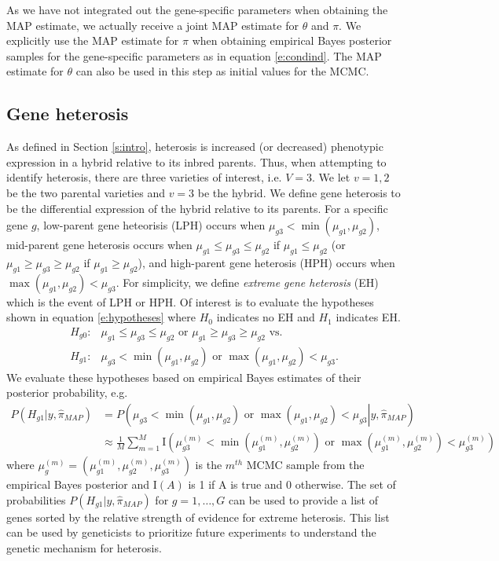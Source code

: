 \documentclass[useAMS,usenatbib,referee]{biom}
\begin{document}
As we have not integrated out the gene-specific parameters when obtaining the MAP estimate, we actually receive a joint MAP estimate for $\theta$ and $\pi$. We explicitly use the MAP estimate for $\pi$ when obtaining empirical Bayes posterior samples for the gene-specific parameters as in equation \eqref{e:condind}. The MAP estimate for $\theta$ can also be used in this step as initial values for the MCMC. 

\subsection{Gene heterosis}
\label{s:gene_heterosis}

As defined in Section \ref{s:intro}, heterosis is increased (or decreased) phenotypic expression in a hybrid relative to its inbred parents. Thus, when attempting to identify heterosis, there are three varieties of interest, i.e. $V=3$. We let $v=1,2$ be the two parental varieties and $v=3$ be the hybrid. We define gene heterosis to be the differential expression of the hybrid relative to its parents. For a specific gene $g$, low-parent gene heteorisis (LPH) occurs when $\mu_{g3}< \min(\mu_{g1},\mu_{g2})$, mid-parent gene heterosis occurs when $\mu_{g1}\le \mu_{g3}\le \mu_{g2}$ if $\mu_{g1}\le \mu_{g2}$ (or $\mu_{g1}\ge \mu_{g3}\ge \mu_{g2}$ if $\mu_{g1}\ge \mu_{g2}$), and high-parent gene heterosis (HPH) occurs when $\max(\mu_{g1},\mu_{g2}) < \mu_{g3}$. For simplicity, we define \emph{extreme gene heterosis} (EH) which is the event of LPH or HPH. Of interest is to evaluate the hypotheses shown in equation \eqref{e:hypotheses} where $H_0$ indicates no EH and $H_1$ indicates EH. 
\begin{align}
H_{g0}:&\mu_{g1}\le \mu_{g3}\le \mu_{g2} \mbox{ or } \mu_{g1}\ge \mu_{g3}\ge \mu_{g2} \mbox{\ \ vs.\ \ } \nonumber \\
H_{g1}:&\mu_{g3}< \min(\mu_{g1},\mu_{g2}) \mbox{ or } \max(\mu_{g1},\mu_{g2}) < \mu_{g3}.
\label{e:hypotheses}
\end{align}
We evaluate these hypotheses based on empirical Bayes estimates of their posterior probability, e.g. 
\begin{align}
P\left(H_{g1}|y, \hat{\pi}_{MAP}\right) &= P\left(\left.\mu_{g3}< \min(\mu_{g1},\mu_{g2}) \mbox{ or } \max(\mu_{g1},\mu_{g2}) < \mu_{g3}\right| y, \hat{\pi}_{MAP}\right) \nonumber \\
&\approx \frac{1}{M} \sum_{m=1}^M \mathrm{I}\left(\mu_{g3}^{(m)}< \min\left(\mu_{g1}^{(m)},\mu_{g2}^{(m)}\right) \mbox{ or } \max\left(\mu_{g1}^{(m)},\mu_{g2}^{(m)}\right) < \mu_{g3}^{(m)}\right) \label{e:probs}
\end{align}
where $\mu_g^{(m)} = \left(\mu_{g1}^{(m)},\mu_{g2}^{(m)},\mu_{g3}^{(m)}\right)$ is the $m^{th}$ MCMC sample from the empirical Bayes posterior and $\mathrm{I}(A)$ is 1 if A is true and 0 otherwise. The set of probabilities $P\left(H_{g1}|y, \hat{\pi}_{MAP}\right)$ for $g=1,\ldots,G$ can be used to provide a list of genes sorted by the relative strength of evidence for extreme heterosis. This list can be used by geneticists to prioritize future experiments to understand the genetic mechanism for heterosis.  
\end{document}
